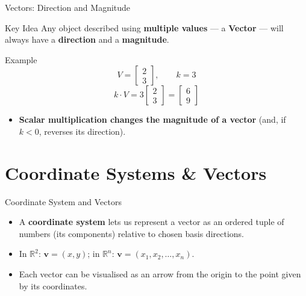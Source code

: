 \documentclass[9pt,aspectratio=169]{beamer}
\newcommand{\R}{\mathbb{R}}
\newcommand{\vect}[1]{\mathbf{#1}}
\begin{document}
\begin{frame}{Vectors: Direction and Magnitude}
\begin{alertblock}{Key Idea}
Any object described using \textbf{multiple values} — a \textbf{Vector} — will always have a \textbf{direction} and a \textbf{magnitude}.
\end{alertblock}
\begin{exampleblock}{Example}
$$V = \begin{bmatrix} 2 \\ 3 \end{bmatrix}, \qquad k = 3$$
$$k \cdot V = 3\begin{bmatrix} 2 \\ 3 \end{bmatrix} = \begin{bmatrix} 6 \\ 9 \end{bmatrix}$$
\end{exampleblock}
\begin{itemize}
\item \textbf{Scalar multiplication changes the magnitude of a vector} (and, if $k<0$, reverses its direction).
\end{itemize}
\end{frame}

\section{Coordinate Systems \& Vectors}

\begin{frame}{Coordinate System and Vectors}
\begin{itemize}
\item A \textbf{coordinate system} lets us represent a vector as an ordered tuple of numbers (its components) relative to chosen basis directions.
\item In $\R^2$: $\vect{v} = (x,y)$; in $\R^n$: $\vect{v} = (x_1, x_2, \dots, x_n)$.
\item Each vector can be visualised as an arrow from the origin to the point given by its coordinates.
\end{itemize}
\centering
{}
\end{frame}
\end{document}
